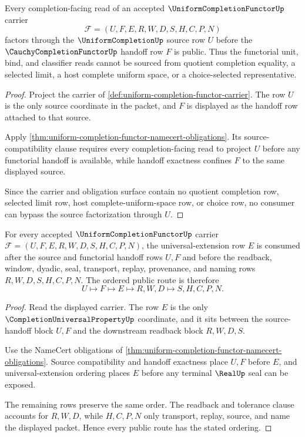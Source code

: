 \begin{theorem}
\label{thm:uniform-completion-functor-source-factorization}
Every completion-facing read of an accepted $\UniformCompletionFunctorUp$ carrier
$$
\mathcal{F}=(U,F,E,R,W,D,S,H,C,P,N)
$$
factors through the $\UniformCompletionUp$ source row $U$ before the $\CauchyCompletionFunctorUp$ handoff row $F$ is public. Thus the functorial unit, bind, and classifier reads cannot be sourced from quotient completion equality, a selected limit, a host complete uniform space, or a choice-selected representative.
\end{theorem}
\begin{proof}
Project the carrier of \autoref{def:uniform-completion-functor-carrier}. The row $U$ is the only source coordinate in the packet, and $F$ is displayed as the handoff row attached to that source.

Apply \autoref{thm:uniform-completion-functor-namecert-obligations}. Its source-compatibility clause requires every completion-facing read to project $U$ before any functorial handoff is available, while handoff exactness confines $F$ to the same displayed source.

Since the carrier and obligation surface contain no quotient completion row, selected limit row, host complete-uniform-space row, or choice row, no consumer can bypass the source factorization through $U$.
\end{proof}

\begin{theorem}
\label{thm:uniform-completion-functor-extension-ordering}
For every accepted $\UniformCompletionFunctorUp$ carrier $\mathcal{F}=(U,F,E,R,W,D,S,H,C,P,N)$, the universal-extension row $E$ is consumed after the source and functorial handoff rows $U,F$ and before the readback, window, dyadic, seal, transport, replay, provenance, and naming rows $R,W,D,S,H,C,P,N$. The ordered public route is therefore
$$
U \longmapsto F \longmapsto E \longmapsto R,W,D \longmapsto S,H,C,P,N .
$$
\end{theorem}
\begin{proof}
Read the displayed carrier. The row $E$ is the only $\CompletionUniversalPropertyUp$ coordinate, and it sits between the source-handoff block $U,F$ and the downstream readback block $R,W,D,S$.

Use the NameCert obligations of \autoref{thm:uniform-completion-functor-namecert-obligations}. Source compatibility and handoff exactness place $U,F$ before $E$, and universal-extension ordering places $E$ before any terminal $\RealUp$ seal can be exposed.

The remaining rows preserve the same order. The readback and tolerance clause accounts for $R,W,D$, while $H,C,P,N$ only transport, replay, source, and name the displayed packet. Hence every public route has the stated ordering.
\end{proof}

